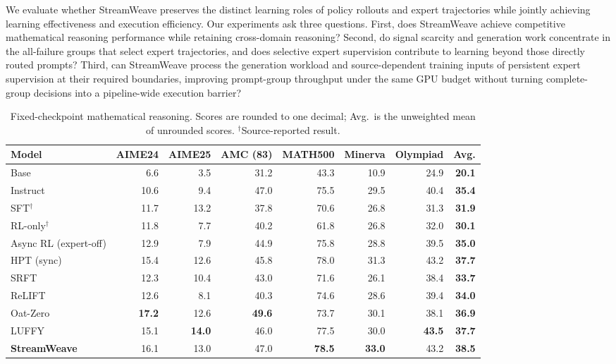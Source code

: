 \documentclass[letterpaper]{article}
\begin{document}
We evaluate whether StreamWeave preserves the distinct learning roles of policy rollouts and expert trajectories while jointly achieving learning effectiveness and execution efficiency.
Our experiments ask three questions.
First, does StreamWeave achieve competitive mathematical reasoning performance while retaining cross-domain reasoning?
Second, do signal scarcity and generation work concentrate in the all-failure groups that select expert trajectories, and does selective expert supervision contribute to learning beyond those directly routed prompts?
Third, can StreamWeave process the generation workload and source-dependent training inputs of persistent expert supervision at their required boundaries, improving prompt-group throughput under the same GPU budget without turning complete-group decisions into a pipeline-wide execution barrier?

\begin{table}[t]
\centering
\begin{tabular}{lrrrrrrr}
\toprule
Model & AIME24 & AIME25 & AMC (83) & MATH500 & Minerva & Olympiad & \textbf{Avg.} \\
\midrule
Base & 6.6 & 3.5 & 31.2 & 43.3 & 10.9 & 24.9 & \textbf{20.1} \\
Instruct & 10.6 & 9.4 & 47.0 & 75.5 & 29.5 & 40.4 & \textbf{35.4} \\
SFT$^{\dagger}$ & 11.7 & 13.2 & 37.8 & 70.6 & 26.8 & 31.3 & \textbf{31.9} \\
RL-only$^{\dagger}$ & 11.8 & 7.7 & 40.2 & 61.8 & 26.8 & 32.0 & \textbf{30.1} \\
Async RL (expert-off) & 12.9 & 7.9 & 44.9 & 75.8 & 28.8 & 39.5 & \textbf{35.0} \\
HPT (sync) & 15.4 & 12.6 & 45.8 & 78.0 & 31.3 & 43.2 & \textbf{37.7} \\
SRFT & 12.3 & 10.4 & 43.0 & 71.6 & 26.1 & 38.4 & \textbf{33.7} \\
ReLIFT & 12.6 & 8.1 & 40.3 & 74.6 & 28.6 & 39.4 & \textbf{34.0} \\
Oat-Zero & \textbf{17.2} & 12.6 & \textbf{49.6} & 73.7 & 30.1 & 38.1 & \textbf{36.9} \\
LUFFY & 15.1 & \textbf{14.0} & 46.0 & 77.5 & 30.0 & \textbf{43.5} & \textbf{37.7} \\
\textbf{StreamWeave} & 16.1 & 13.0 & 47.0 & \textbf{78.5} & \textbf{33.0} & 43.2 & \textbf{38.5} \\
\bottomrule
\end{tabular}
\caption{Fixed-checkpoint mathematical reasoning.
Scores are rounded to one decimal; Avg.\ is the unweighted mean of unrounded scores.
$^{\dagger}$Source-reported result.}
\label{tab:math-reasoning}
\end{table}
\end{document}
